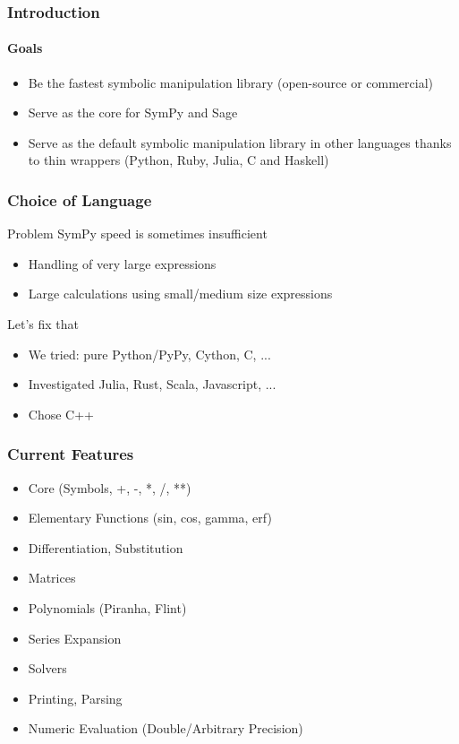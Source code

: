 \documentclass{beamer}
\begin{document}
\begin{frame}
\frametitle{Introduction}
\framesubtitle{Goals}
\begin{itemize}
\item Be the fastest symbolic manipulation library (open-source or commercial)
\item Serve as the core for SymPy and Sage
\item Serve as the default symbolic manipulation library in other languages
    thanks to thin wrappers (Python, Ruby, Julia, C and Haskell)
\end{itemize}
\end{frame}


\begin{frame}
\frametitle{Choice of Language}
\begin{block}{Problem}
SymPy speed is sometimes insufficient
\begin{itemize}
\item Handling of very large expressions
\item Large calculations using small/medium size expressions
\end{itemize}
\end{block}

\begin{block}{Let's fix that}
\begin{itemize}
\item We tried: pure Python/PyPy, Cython, C, ...
\item Investigated Julia, Rust, Scala, Javascript, ...
\item Chose C++
\end{itemize}
\end{block}
\end{frame}




\begin{frame}
\frametitle{Current Features}
\begin{itemize}
    \item Core (Symbols, +, -, *, /, **)
    \item Elementary Functions (sin, cos, gamma, erf)
    \item Differentiation, Substitution
    \item Matrices
    \item Polynomials (Piranha, Flint)
    \item Series Expansion
    \item Solvers
    \item Printing, Parsing
    \item Numeric Evaluation (Double/Arbitrary Precision)
\end{itemize}
\end{frame}
\end{document}
